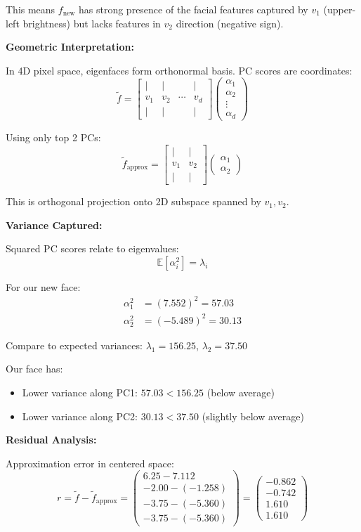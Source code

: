 \documentclass[12pt]{article}
\begin{document}
\begin{explanation}
This means $f_{\text{new}}$ has strong presence of the facial features captured by $v_1$ (upper-left brightness) but lacks features in $v_2$ direction (negative sign).

\textbf{Geometric Interpretation:}

In 4D pixel space, eigenfaces form orthonormal basis. PC scores are coordinates:
\[
\tilde{f} = \begin{bmatrix}
| & | & & | \\
v_1 & v_2 & \cdots & v_d \\
| & | & & |
\end{bmatrix}
\begin{pmatrix}
\alpha_1 \\
\alpha_2 \\
\vdots \\
\alpha_d
\end{pmatrix}
\]

Using only top 2 PCs:
\[
\tilde{f}_{\text{approx}} = \begin{bmatrix}
| & | \\
v_1 & v_2 \\
| & |
\end{bmatrix}
\begin{pmatrix}
\alpha_1 \\
\alpha_2
\end{pmatrix}
\]

This is orthogonal projection onto 2D subspace spanned by $v_1, v_2$.

\textbf{Variance Captured:}

Squared PC scores relate to eigenvalues:
\[
\mathbb{E}[\alpha_i^2] = \lambda_i
\]

For our new face:
\begin{align*}
\alpha_1^2 &= (7.552)^2 = 57.03 \\
\alpha_2^2 &= (-5.489)^2 = 30.13
\end{align*}

Compare to expected variances: $\lambda_1 = 156.25$, $\lambda_2 = 37.50$

Our face has:
\begin{itemize}
    \item Lower variance along PC1: $57.03 < 156.25$ (below average)
    \item Lower variance along PC2: $30.13 < 37.50$ (slightly below average)
\end{itemize}

\textbf{Residual Analysis:}

Approximation error in centered space:
\[
r = \tilde{f} - \tilde{f}_{\text{approx}} = \begin{pmatrix}
6.25 - 7.112 \\
-2.00 - (-1.258) \\
-3.75 - (-5.360) \\
-3.75 - (-5.360)
\end{pmatrix} = \begin{pmatrix}
-0.862 \\
-0.742 \\
1.610 \\
1.610
\end{pmatrix}
\]


\end{explanation}
\end{document}
